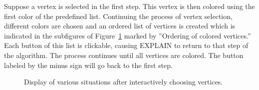 \documentclass[12pt, twoside,a4paper,toc=bibliography]{scrbook}
\newcommand{\figref}[1]{Figure~\protect\ref{#1}}
\begin{document}
Suppose a vertex is selected in the first step. 
This vertex is then colored using the first color of the predefined list. 
Continuing the process of vertex selection, 
different colors are chosen and an ordered list of vertices is created 
which is indicated in the subfigures of \figref{algorihtm} marked by ''Ordering of colored vertices.'' 
Each button of this list is clickable, causing \mbox{EXPLAIN} to return to that step of the algorithm. 
The process continues until all vertices are colored. 
The button labeled by the minus sign will go back to the first step.


\begin{figure}
\centering
{}
\centering
{}
\centering
{}
\centering
{}
\caption{Display of various situations after interactively choosing vertices.}
\label{algorihtm}
\end{figure}
\end{document}
